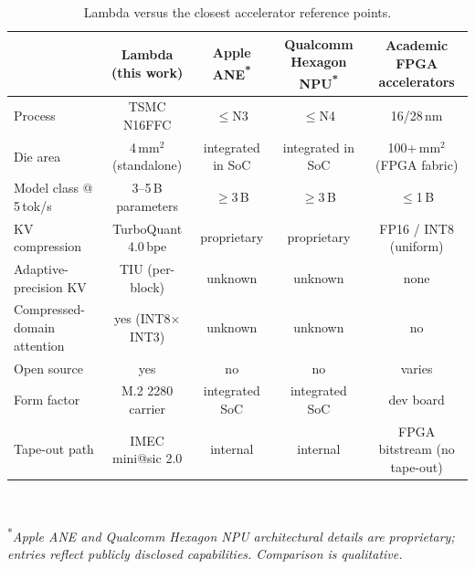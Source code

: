 \documentclass[conference]{IEEEtran}
\begin{document}
\begin{table}[t]
\centering
\caption{Lambda versus the closest accelerator reference points.}
\label{tab:comp}
\setlength{\tabcolsep}{6pt}
\renewcommand{\arraystretch}{1.15}
\footnotesize
\begin{tabular}{lcccc}
\toprule
& \textbf{Lambda (this work)} & \textbf{Apple ANE}\textsuperscript{*} & \textbf{Qualcomm Hexagon NPU}\textsuperscript{*} & \textbf{Academic FPGA accelerators} \\
\midrule
Process                       & TSMC N16FFC          & $\le$N3                & $\le$N4                & 16/28\,nm                       \\
Die area                      & 4\,mm$^2$ (standalone) & integrated in SoC      & integrated in SoC      & 100+\,mm$^2$ (FPGA fabric)      \\
Model class @ 5\,tok/s        & 3--5\,B parameters   & $\ge$3\,B              & $\ge$3\,B              & $\le$1\,B                       \\
KV compression                & TurboQuant 4.0\,bpe  & proprietary            & proprietary            & FP16 / INT8 (uniform)           \\
Adaptive-precision KV         & TIU (per-block)      & unknown                & unknown                & none                            \\
Compressed-domain attention   & yes (INT8$\times$INT3) & unknown              & unknown                & no                              \\
Open source                   & yes                  & no                     & no                     & varies                          \\
Form factor                   & M.2 2280 carrier     & integrated SoC         & integrated SoC         & dev board                       \\
Tape-out path                 & IMEC mini@sic 2.0    & internal               & internal               & FPGA bitstream (no tape-out)    \\
\bottomrule
\end{tabular}\\[2pt]
\raggedright\footnotesize\textsuperscript{*}\textit{Apple ANE and Qualcomm Hexagon NPU architectural details are proprietary; entries reflect publicly disclosed capabilities. Comparison is qualitative.}
\end{table}
\end{document}
